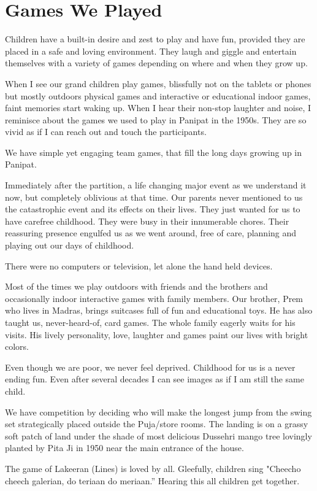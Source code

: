 \chapter{Games We Played}
Children have a built-in desire and zest to play and have fun, provided
they are placed in a safe and loving environment. They laugh and giggle
and entertain themselves with a variety of games depending on where and
when they grow up. 

When I see our grand children play games, blissfully not on the tablets or
phones but mostly outdoors physical games and interactive or educational
indoor games, faint memories start waking up. When I hear their non-stop
laughter and noise, I reminisce about the games we used to play in Panipat
in the 1950s. They are so vivid as if I can reach out and touch the
participants. 

We have simple yet engaging team games, that fill the long days growing up
in Panipat. 

Immediately after the partition, a life changing major event as we
understand it now, but completely oblivious at that time. Our parents
never mentioned to us the catastrophic event and its effects on their
lives. They just wanted for us to have carefree childhood. They were busy
in their innumerable chores. Their reassuring presence engulfed us as we
went around, free of care, planning and playing out our days of childhood. 

There were no computers or television, let alone the hand held devices. 

Most of the times we play outdoors with friends and the brothers and
occasionally indoor interactive games with family members. Our brother,
Prem who lives in Madras, brings suitcases full of fun and educational
toys. He has also taught us, never-heard-of, card games. The whole family
eagerly waits for his visits. His lively personality, love, laughter and
games paint our lives with bright colors. 

Even though we are poor, we never feel deprived. Childhood for us is
a never ending fun. Even after several decades I can see images as if I am
still the same child. 

We have competition by deciding who will make the longest jump from the
swing set strategically placed outside the Puja/store rooms. The landing
is on a grassy soft patch of land under the shade of most delicious
Dussehri mango tree lovingly planted by Pita Ji in 1950 near the main
entrance of the house. 

The game of Lakeeran (Lines) is loved by all.  Gleefully, children sing
"Cheecho cheech galerian, do teriaan do meriaan.” Hearing this all
children get together. 

